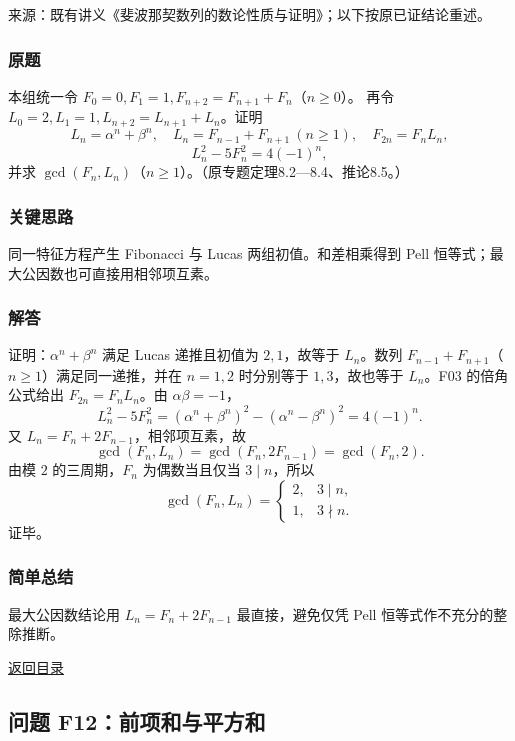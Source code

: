 \documentclass[11pt,a4paper]{article}
\begin{document}
来源：既有讲义《斐波那契数列的数论性质与证明》；以下按原已证结论重述。

\subsubsection{原题}\label{ux539fux9898-43}

本组统一令 \(F_0=0,F_1=1,F_{n+2}=F_{n+1}+F_n\)（\(n\ge0\)）。 再令
\(L_0=2,L_1=1,L_{n+2}=L_{n+1}+L_n\)。证明 \[
L_n=\alpha^n+\beta^n,\quad L_n=F_{n-1}+F_{n+1}\ (n\ge1),\quad F_{2n}=F_nL_n,
\] \[L_n^2-5F_n^2=4(-1)^n,\] 并求
\(\gcd(F_n,L_n)\)（\(n\ge1\)）。（原专题定理8.2---8.4、推论8.5。）

\subsubsection{关键思路}\label{ux5173ux952eux601dux8def-43}

同一特征方程产生 Fibonacci 与 Lucas 两组初值。和差相乘得到 Pell
恒等式；最大公因数也可直接用相邻项互素。

\subsubsection{解答}\label{ux89e3ux7b54-43}

证明：\(\alpha^n+\beta^n\) 满足 Lucas 递推且初值为 \(2,1\)，故等于
\(L_n\)。数列 \(F_{n-1}+F_{n+1}\)（\(n\ge1\)）满足同一递推，并在
\(n=1,2\) 时分别等于 \(1,3\)，故也等于 \(L_n\)。F03 的倍角公式给出
\(F_{2n}=F_nL_n\)。由 \(\alpha\beta=-1\)，
\[L_n^2-5F_n^2=(\alpha^n+\beta^n)^2-(\alpha^n-\beta^n)^2=4(-1)^n.\] 又
\(L_n=F_n+2F_{n-1}\)，相邻项互素，故
\[\gcd(F_n,L_n)=\gcd(F_n,2F_{n-1})=\gcd(F_n,2).\] 由模 \(2\)
的三周期，\(F_n\) 为偶数当且仅当 \(3\mid n\)，所以
\[\boxed{\gcd(F_n,L_n)=\begin{cases}2,&3\mid n,\\1,&3\nmid n.\end{cases}}\]
证毕。

\subsubsection{简单总结}\label{ux7b80ux5355ux603bux7ed3-43}

最大公因数结论用 \(L_n=F_n+2F_{n-1}\) 最直接，避免仅凭 Pell
恒等式作不充分的整除推断。

\noindent\hyperref[contents]{返回目录}

\subsection{问题
F12：前项和与平方和}\label{ux95eeux9898-f12ux524dux9879ux548cux4e0eux5e73ux65b9ux548c}
\end{document}
